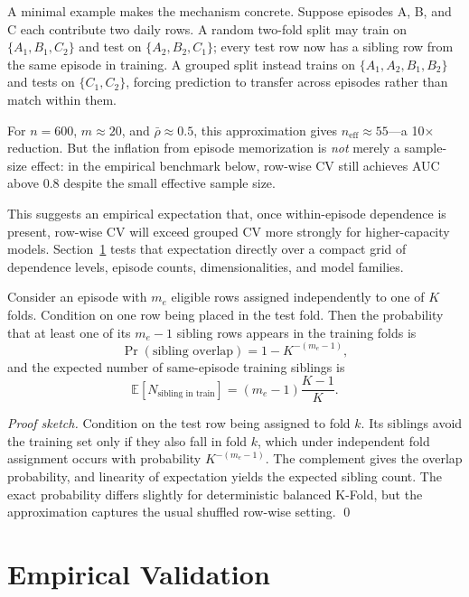 \documentclass[runningheads]{llncs}
\newcommand{\1}{\mathbf{1}}
\begin{document}
A minimal example makes the mechanism concrete. Suppose episodes A, B, and C each contribute two daily rows. A random two-fold split may train on $\{A_1,B_1,C_2\}$ and test on $\{A_2,B_2,C_1\}$; every test row now has a sibling row from the same episode in training. A grouped split instead trains on $\{A_1,A_2,B_1,B_2\}$ and tests on $\{C_1,C_2\}$, forcing prediction to transfer across episodes rather than match within them.

For $n=600$, $m \approx 20$, and $\bar{\rho} \approx 0.5$, this approximation gives $n_{\text{eff}} \approx 55$---a 10$\times$ reduction. But the inflation from episode memorization is \textit{not} merely a sample-size effect: in the empirical benchmark below, row-wise CV still achieves AUC above 0.8 despite the small effective sample size.

This suggests an empirical expectation that, once within-episode dependence is present, row-wise CV will exceed grouped CV more strongly for higher-capacity models. Section~\ref{sec:empirical} tests that expectation directly over a compact grid of dependence levels, episode counts, dimensionalities, and model families.

\begin{proposition}\label{prop:overlap}
Consider an episode with $m_e$ eligible rows assigned independently to one of $K$ folds. Condition on one row being placed in the test fold. Then the probability that at least one of its $m_e-1$ sibling rows appears in the training folds is
\[
\Pr(\text{sibling overlap}) = 1 - K^{-(m_e-1)},
\]
and the expected number of same-episode training siblings is
\[
\mathbb{E}[N_{\text{sibling in train}}] = (m_e-1)\frac{K-1}{K}.
\]
\end{proposition}

\textit{Proof sketch.} Condition on the test row being assigned to fold $k$. Its siblings avoid the training set only if they also fall in fold $k$, which under independent fold assignment occurs with probability $K^{-(m_e-1)}$. The complement gives the overlap probability, and linearity of expectation yields the expected sibling count. The exact probability differs slightly for deterministic balanced K-Fold, but the approximation captures the usual shuffled row-wise setting. \qed

\section{Empirical Validation}\label{sec:empirical}
\end{document}
